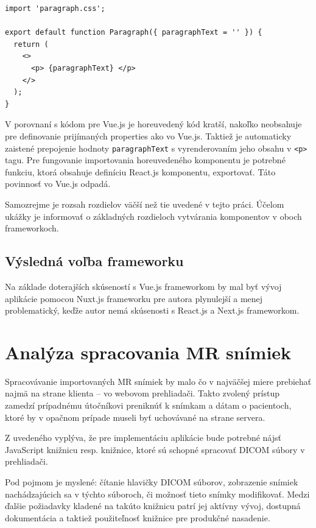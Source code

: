 \begin{minipage}[]{\linewidth}
\begin{verbatim}
import 'paragraph.css';

export default function Paragraph({ paragraphText = '' }) {
  return (
    <>
      <p> {paragraphText} </p>
    </>
  );
}
\end{verbatim}
\end{minipage}

V porovnaní s kódom pre Vue.js je horeuvedený kód kratší, nakoľko neobsahuje  pre definovanie prijímaných properties ako vo Vue.js. Taktiež je automaticky zaistené prepojenie hodnoty \texttt{paragraphText} s vyrenderovaním jeho obsahu v \texttt{<p>} tagu. Pre fungovanie importovania horeuvedeného komponentu je potrebné funkciu, ktorá obsahuje definíciu React.js komponentu, exportovať. Táto povinnosť vo Vue.js odpadá.

Samozrejme je rozsah rozdielov väčší než tie uvedené v tejto práci. Účelom ukážky je informovať o základných rozdieloch vytvárania komponentov v oboch frameworkoch.

\subsection {Výsledná voľba frameworku}
Na základe doterajších skúseností s Vue.js frameworkom by mal byť vývoj aplikácie pomocou Nuxt.js frameworku pre autora plynulejší a menej problematický, keďže autor nemá skúsenosti s React.js a Next.js frameworkom.

\clearpage

\section {Analýza spracovania MR snímiek}
Spracovávanie importovaných MR snímiek by malo čo v najväčšej miere prebiehať najmä na strane klienta -- vo webovom prehliadači. Takto zvolený prístup zamedzí prípadnému útočníkovi preniknúť k snímkam a dátam o pacientoch, ktoré by v opačnom prípade museli byť uchovávané na strane servera.

Z uvedeného vyplýva, že pre implementáciu aplikácie bude potrebné nájsť JavaScript knižnicu resp. knižnice, ktoré sú schopné spracovať DICOM súbory v prehliadači.

Pod pojmom  je myslené: čítanie hlavičky DICOM súborov, zobrazenie snímiek nachádzajúcich sa v týchto súboroch, či možnosť tieto snímky modifikovať. Medzi ďalšie požiadavky kladené na takúto knižnicu patrí jej aktívny vývoj, dostupná dokumentácia a taktiež použiteľnosť knižnice pre produkčné nasadenie.

